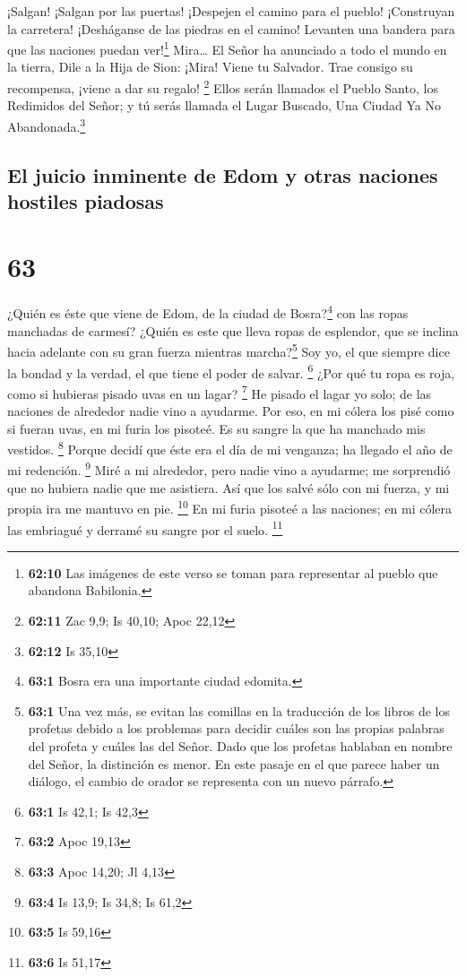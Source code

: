  ¡Salgan! ¡Salgan por las puertas! ¡Despejen el camino
para el pueblo! ¡Construyan la carretera! ¡Desháganse de las piedras en
el camino! Levanten una bandera para que las naciones puedan
ver!\footnote{\textbf{62:10} Las imágenes de este verso se toman para
  representar al pueblo que abandona Babilonia.} 
Mira\ldots{} El Señor ha anunciado a todo el mundo en la tierra, Dile a
la Hija de Sion: ¡Mira! Viene tu Salvador. Trae consigo su recompensa,
¡viene a dar su regalo! \footnote{\textbf{62:11} Zac 9,9; Is 40,10; Apoc
  22,12}  Ellos serán llamados el Pueblo Santo, los
Redimidos del Señor; y tú serás llamada el Lugar Buscado, Una Ciudad Ya
No Abandonada.\footnote{\textbf{62:12} Is 35,10}

\hypertarget{el-juicio-inminente-de-edom-y-otras-naciones-hostiles-piadosas}{%
\subsection{El juicio inminente de Edom y otras naciones hostiles
piadosas}\label{el-juicio-inminente-de-edom-y-otras-naciones-hostiles-piadosas}}

\hypertarget{section-62}{%
\section{63}\label{section-62}}

 ¿Quién es éste que viene de Edom, de la ciudad de
Bosra?\footnote{\textbf{63:1} Bosra era una importante ciudad edomita.}
con las ropas manchadas de carmesí? ¿Quién es este que lleva ropas de
esplendor, que se inclina hacia adelante con su gran fuerza mientras
marcha?\footnote{\textbf{63:1} Una vez más, se evitan las comillas en la
  traducción de los libros de los profetas debido a los problemas para
  decidir cuáles son las propias palabras del profeta y cuáles las del
  Señor. Dado que los profetas hablaban en nombre del Señor, la
  distinción es menor. En este pasaje en el que parece haber un diálogo,
  el cambio de orador se representa con un nuevo párrafo.} Soy yo, el
que siempre dice la bondad y la verdad, el que tiene el poder de salvar.
\footnote{\textbf{63:1} Is 42,1; Is 42,3}  ¿Por qué tu
ropa es roja, como si hubieras pisado uvas en un lagar? \footnote{\textbf{63:2}
  Apoc 19,13}  He pisado el lagar yo solo; de las naciones
de alrededor nadie vino a ayudarme. Por eso, en mi cólera los pisé como
si fueran uvas, en mi furia los pisoteé. Es su sangre la que ha manchado
mis vestidos. \footnote{\textbf{63:3} Apoc 14,20; Jl 4,13}
 Porque decidí que éste era el día de mi venganza; ha
llegado el año de mi redención. \footnote{\textbf{63:4} Is 13,9; Is
  34,8; Is 61,2}  Miré a mi alrededor, pero nadie vino a
ayudarme; me sorprendió que no hubiera nadie que me asistiera. Así que
los salvé sólo con mi fuerza, y mi propia ira me mantuvo en pie.
\footnote{\textbf{63:5} Is 59,16}  En mi furia pisoteé a
las naciones; en mi cólera las embriagué y derramé su sangre por el
suelo. \footnote{\textbf{63:6} Is 51,17}

